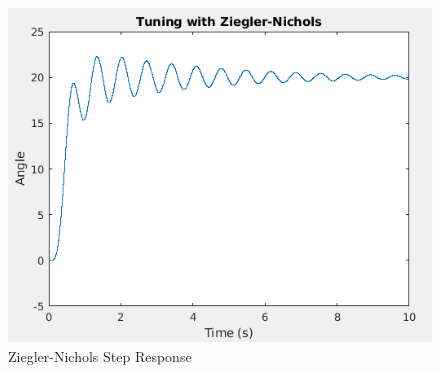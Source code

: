 \documentclass[a4paper, 11pt, compsoc]{IEEEtran}
\begin{document}
				\begin{figure}[!ht]
					\centering
					\includegraphics[width=\columnwidth]{lab6ZN.png}
					\caption{Ziegler-Nichols Step Response}
					\label{fig:lab6ZN}
				\end{figure}
\end{document}

